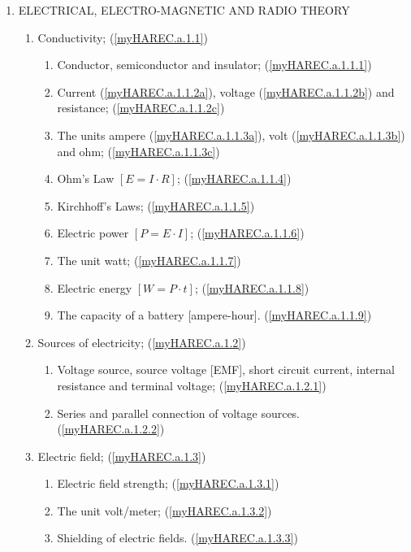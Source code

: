\begin{enumerate}
\item ELECTRICAL, ELECTRO-MAGNETIC AND RADIO THEORY
\begin{enumerate}[noitemsep]

\item Conductivity; (\ref{myHAREC.a.1.1})\label{HAREC.a.1.1}
\begin{enumerate}[noitemsep]
\item Conductor, semiconductor and insulator; (\ref{myHAREC.a.1.1.1})\label{HAREC.a.1.1.1}
\item Current (\ref{myHAREC.a.1.1.2a}), voltage (\ref{myHAREC.a.1.1.2b}) and resistance; (\ref{myHAREC.a.1.1.2c})\label{HAREC.a.1.1.2}
\item The units ampere (\ref{myHAREC.a.1.1.3a}), volt (\ref{myHAREC.a.1.1.3b}) and ohm; (\ref{myHAREC.a.1.1.3c})\label{HAREC.a.1.1.3}
\item Ohm's Law  \(\left[E = I \cdot R\right]\); (\ref{myHAREC.a.1.1.4})\label{HAREC.a.1.1.4}
\item Kirchhoff's Laws; (\ref{myHAREC.a.1.1.5})\label{HAREC.a.1.1.5}
\item Electric power \(\left[P = E \cdot I\right]\); (\ref{myHAREC.a.1.1.6})\label{HAREC.a.1.1.6}
\item The unit watt; (\ref{myHAREC.a.1.1.7})\label{HAREC.a.1.1.7}
\item Electric energy \(\left[W = P \cdot t\right]\); (\ref{myHAREC.a.1.1.8})\label{HAREC.a.1.1.8}
\item The capacity of a battery [ampere-hour]. (\ref{myHAREC.a.1.1.9})\label{HAREC.a.1.1.9}
\end{enumerate}

\item Sources of electricity; (\ref{myHAREC.a.1.2})\label{HAREC.a.1.2}
\begin{enumerate}[noitemsep]
\item Voltage source, source voltage [EMF], short circuit current, inter­nal resistance and terminal voltage; (\ref{myHAREC.a.1.2.1})\label{HAREC.a.1.2.1}
\item Series and parallel connection of voltage sources. (\ref{myHAREC.a.1.2.2})\label{HAREC.a.1.2.2}
\end{enumerate}

\item Electric field; (\ref{myHAREC.a.1.3})\label{HAREC.a.1.3}
\begin{enumerate}[noitemsep]
\item Electric field strength; (\ref{myHAREC.a.1.3.1})\label{HAREC.a.1.3.1}
\item The unit volt/meter; (\ref{myHAREC.a.1.3.2})\label{HAREC.a.1.3.2}
\item Shielding of electric fields. (\ref{myHAREC.a.1.3.3})\label{HAREC.a.1.3.3}
\end{enumerate}


\end{enumerate}
\end{enumerate}

